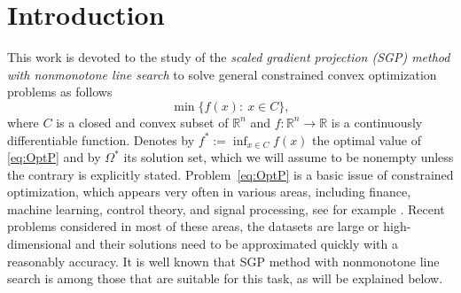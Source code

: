 
\chapter*{Introduction}


This  work is  devoted  to the study of  the {\it scaled gradient projection (SGP) method with nonmonotone line search} to solve general  constrained convex optimization problems as follows
\begin{equation} \label{eq:OptP}
	\min \{ f(x) :~   x\in C\},
\end{equation}
where $C$ is a closed and convex subset of $\mathbb{R}^n$ and $f:\mathbb{R}^n \to \mathbb{R}$ is a continuously differentiable function. Denotes by $f^*:= \inf_{x\in C} f(x)$ the optimal value  of \eqref{eq:OptP} and by  $\Omega^*$  its  solution set, which we will assume to be nonempty unless the contrary is explicitly stated.  Problem~\eqref{eq:OptP} is a basic issue of constrained  optimization, which appears very often in various areas, including  finance,    machine learning, control theory, and signal processing, see for example \cite{Bottou_Curtis_Nocedal2018, Boyd_Ghaoui_Ferron1994, Figueiredo2007, Higham2002, Ma_Hu_Gao2015, Sra_Nowozin_Wright2012}.  Recent problems considered in most of these areas, the datasets are large or high-dimensional  and their solutions need to be approximated quickly with a reasonably accuracy. It is well known that SGP method with nonmonotone line search is among those that are suitable for this task, as will be explained below.

